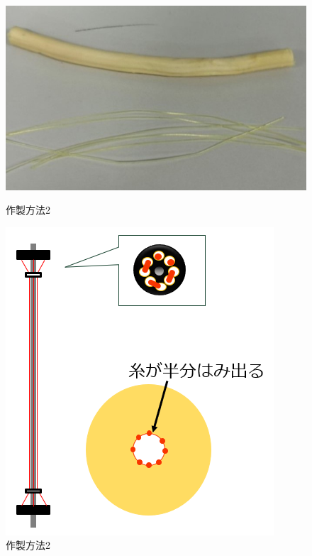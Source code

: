 \begin{figure}[htbp]
  \centering
  \begin{minipage}{0.49\hsize}
      \centering
      \includegraphics[scale=0.3]{pic/20.jpg}
      \caption{作製方法2}
       \label{fig:22}
  \end{minipage} \hfill
  \begin{minipage}{0.49\hsize}
      \centering
      \includegraphics[scale=0.5]{pic/21.PNG}
      \caption{作製方法2}
      \label{fig:23}
  \end{minipage} 
\end{figure}


\newpage
